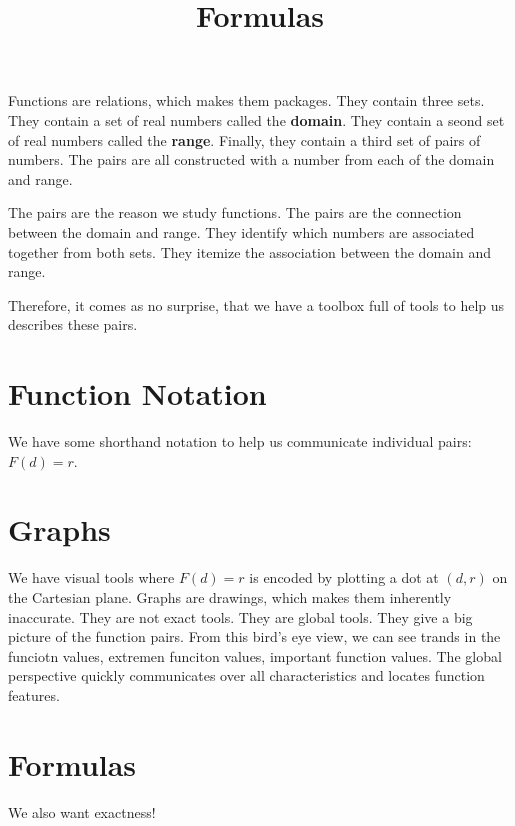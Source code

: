 \documentclass{ximera}
\title{Formulas}
\begin{document}
\begin{abstract}

\end{abstract}
\maketitle


Functions are relations, which makes them packages.  They contain three sets.  They contain a set of real numbers called the \textbf{domain}.  They contain a seond set of real numbers called the \textbf{range}. Finally, they contain a third set of pairs of numbers.  The pairs are all constructed with a number from each of the domain and range.

The pairs are the reason we study functions.  The pairs are the connection between the domain and range.  They identify which numbers are associated together from both sets. They itemize the association between the domain and range.

Therefore, it comes as no surprise, that we have a toolbox full of tools to help us describes these pairs.


\section{Function Notation}

We have some shorthand notation to help us communicate individual pairs: $F(d) = r$.



\section{Graphs}

We have visual tools where $F(d) = r$ is encoded by plotting a dot at $(d, r)$ on the Cartesian plane.  Graphs are drawings, which makes them inherently inaccurate.  They are not exact tools.  They are global tools.  They give a big picture of the function pairs.  From this bird's eye view, we can see trands in the funciotn values, extremen funciton values, important function values. The global perspective quickly communicates over all characteristics and locates function features.


\section{Formulas}
We also want exactness!
\end{document}
